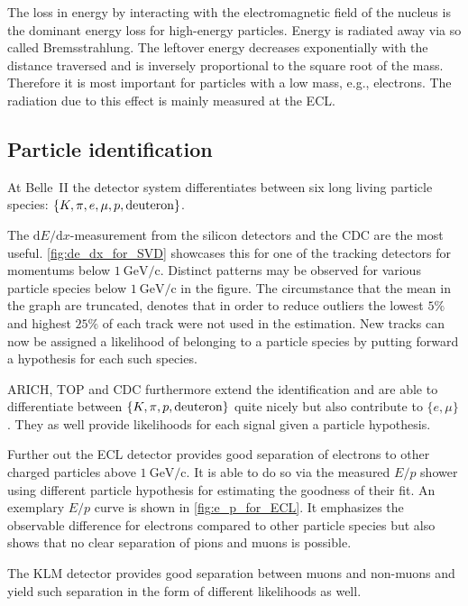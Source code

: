 The loss in energy by interacting with the electromagnetic field of the nucleus is the dominant energy loss for high-energy particles. Energy is radiated away via so called Bremsstrahlung. The leftover energy decreases exponentially with the distance traversed and is inversely proportional to the square root of the mass. Therefore it is most important for particles with a low mass, e.g., electrons.
The radiation due to this effect is mainly measured at the ECL.

\subsection{Particle identification}
\label{subsec:particle_identification}

At Belle~\RN{2} the detector system differentiates between six long living particle species: $\{K, \pi, e, \mu, p, \hbox{deuteron}\}$.

The $\mathrm{d}E/\mathrm{d}x$-measurement from the silicon detectors and the CDC are the most useful. \autoref{fig:de_dx_for_SVD} showcases this for one of the tracking detectors for momentums below $1 \mathrm{~GeV/c}$. Distinct patterns may be observed for various particle species below $1 \mathrm{~GeV/c}$ in the figure. The circumstance that the mean in the graph are truncated, denotes that in order to reduce outliers the lowest $5\%$ and highest $25\%$ of each track were not used in the estimation.
New tracks can now be assigned a likelihood of belonging to a particle species by putting forward a hypothesis for each such species.

ARICH, TOP and CDC furthermore extend the identification and are able to differentiate between $\{K, \pi, p, \hbox{deuteron}\}$ quite nicely but also contribute to $\{e, \mu\}$. They as well provide likelihoods for each signal given a particle hypothesis.

Further out the ECL detector provides good separation of electrons to other charged particles above $1 \mathrm{~GeV/c}$. It is able to do so via the measured $E/p$ shower using different particle hypothesis for estimating the goodness of their fit. An exemplary $E/p$ curve is shown in \autoref{fig:e_p_for_ECL}. It emphasizes the observable difference for electrons compared to other particle species but also shows that no clear separation of pions and muons is possible.

The KLM detector provides good separation between muons and non-muons and yield such separation in the form of different likelihoods as well.

